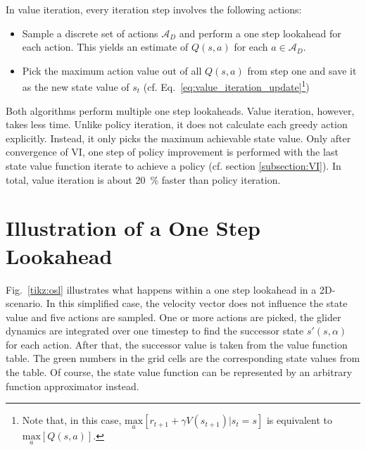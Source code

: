 In value iteration, every iteration step involves the following actions:

\begin{itemize}
	\item Sample a discrete set of actions $\mathcal{A}_D$ and perform a one step lookahead for each action. This yields an estimate of $Q(s,a)$ for each $a\in \mathcal{A}_D$.
	\item Pick the maximum action value out of all $Q(s,a)$ from step one and save it as the new state value of $s_t$ (cf. Eq.~\ref{eq:value_iteration_update}\footnote{Note that, in this case, $\underset{a}{\text{max}}[r_{t+1}+\gamma V(s_{t+1})|s_t=s]$ is equivalent to $\underset{a}{\text{max}}[Q(s,a)]$.})
\end{itemize}

Both algorithms perform multiple one step lookaheads. Value iteration, however, takes less time. Unlike policy iteration, it does not calculate each greedy action explicitly. Instead, it only picks the maximum achievable state value. Only after convergence of VI, one step of policy improvement is performed with the last state value function iterate to achieve a policy (cf. section \ref{subsection:VI}). In total, value iteration is about 20~\% faster than policy iteration. \newpage

\section{Illustration of a One Step Lookahead}

Fig.~\ref{tikz:osl} illustrates what happens within a one step lookahead in a 2D-scenario. In this simplified case, the velocity vector does not influence the state value and five actions are sampled. One or more actions are picked, the glider dynamics are integrated over one timestep to find the successor state $s'(s,\alpha)$ for each action. After that, the successor value is taken from the value function table. The green numbers in the grid cells are the corresponding state values from the table. Of course, the state value function can be represented by an arbitrary function approximator instead. 

